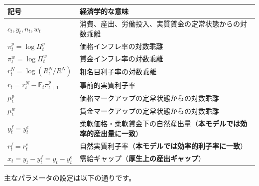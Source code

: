 \documentclass[
  japanese,
  lualatex,
  ja=standard,
  12pt,
  a4paper]{ltjsarticle}
\newcounter{none} %
\begin{document}
{\def\LTcaptype{none} %
\begin{longtable}[]{@{}
  >{\raggedright\arraybackslash}p{}
  >{\raggedright\arraybackslash}p{}@{}}
\toprule\noalign{}
\begin{minipage}[b]{\linewidth}\raggedright
記号
\end{minipage} & \begin{minipage}[b]{\linewidth}\raggedright
経済学的な意味
\end{minipage} \\
\midrule\noalign{}
\endhead
\bottomrule\noalign{}
\endlastfoot
\(c_t, y_t, n_t, w_t\) &
消費、産出、労働投入、実質賃金の定常状態からの対数乖離 \\
\(\pi_t^p=\log\Pi_t^p\) & 価格インフレ率の対数乖離 \\
\(\pi_t^w=\log\Pi_t^w\) & 賃金インフレ率の対数乖離 \\
\(r_t^N=\log(R_t^N/R^N)\) & 粗名目利子率の対数乖離 \\
\(r_t=r_t^N-\mathbb{E}_t\pi^p_{t+1}\) & 事前的実質利子率 \\
\(\mu_t^p\) & 価格マークアップの定常状態からの対数乖離 \\
\(\mu_t^w\) & 賃金マークアップの定常状態からの対数乖離 \\
\(y_t^f=y_t^e\) &
柔軟価格・柔軟賃金下の自然産出量（\textbf{本モデルでは効率的産出量に一致}） \\
\(r_t^f=r_t^e\) &
自然実質利子率（\textbf{本モデルでは効率的利子率に一致}） \\
\(x_t=y_t-y_t^f=y_t-y_t^e\) &
需給ギャップ（\textbf{厚生上の産出ギャップ}） \\
\end{longtable}
}

主なパラメータの設定は以下の通りです。
\end{document}
